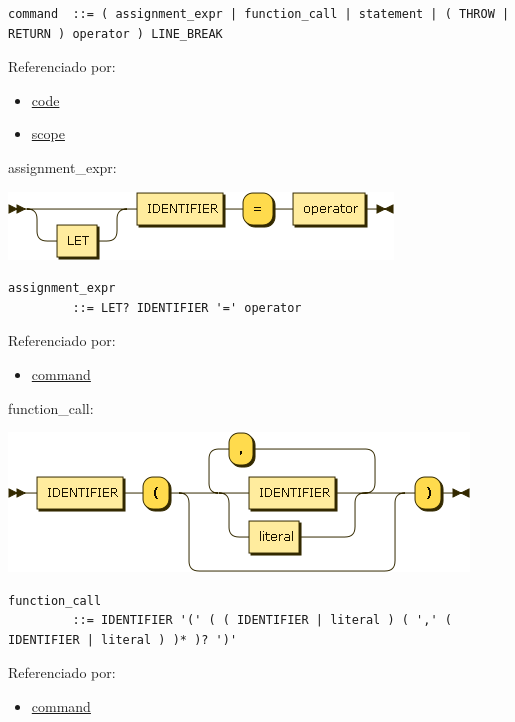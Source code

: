 \begin{verbatim}
command  ::= ( assignment_expr | function_call | statement | ( THROW | RETURN ) operator ) LINE_BREAK
\end{verbatim}

Referenciado por:

\begin{itemize}
\tightlist
\item
  \protect\hyperlink{code}{code}
\item
  \protect\hyperlink{scope}{scope}
\end{itemize}

\protect\hypertarget{assignment_expr}{}{assignment\_expr:}

\includegraphics[width=4.02083in,height=0.70833in]{diagram/assignment_expr.png}

\begin{verbatim}
assignment_expr
         ::= LET? IDENTIFIER '=' operator
\end{verbatim}

Referenciado por:

\begin{itemize}
\tightlist
\item
  \protect\hyperlink{command}{command}
\end{itemize}

\protect\hypertarget{function_call}{}{function\_call:}

\includegraphics[width=4.81250in,height=1.45833in]{diagram/function_call.png}

\begin{verbatim}
function_call
         ::= IDENTIFIER '(' ( ( IDENTIFIER | literal ) ( ',' ( IDENTIFIER | literal ) )* )? ')'
\end{verbatim}

Referenciado por:

\begin{itemize}
\tightlist
\item
  \protect\hyperlink{command}{command}
\end{itemize}

